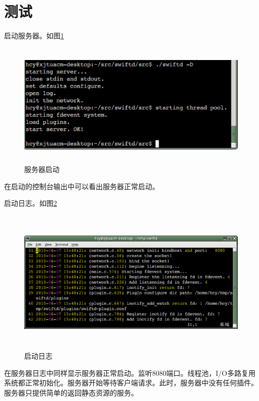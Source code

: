 \documentclass[12pt, twoside, a4paper, xetex]{report}
\begin{document}
\section{测试}
	启动服务器。如图\ref{startup}
	
	\begin{figure}[htbp]
	\centering
	\setlength{\abovecaptionskip}{0pt}
	\setlength{\belowcaptionskip}{10pt}
	\caption{服务器启动}
	\label{startup}
	\includegraphics[height=6cm, width=15cm]{pics/startup.eps}
	\end{figure}
	
	在启动的控制台输出中可以看出服务器正常启动。
	
	启动日志。如图\ref{startuplog}
	
	\begin{figure}[htbp]
	\centering
	\setlength{\abovecaptionskip}{0pt}
	\setlength{\belowcaptionskip}{10pt}
	\caption{启动日志}
	\label{startuplog}
	\includegraphics[height=7cm, width=16cm]{pics/startuplog.eps}
	\end{figure}
	
	在服务器日志中同样显示服务器正常启动。监听8080端口。线程池，I/O多路复用系统都正常初始化。服务器开始等待客户端请求。此时，服务器中没有任何插件。服务器只提供简单的返回静态资源的服务。
	
\end{document}
